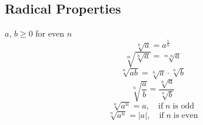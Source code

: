 \documentclass[12pt, a5paper]{article}
\begin{document}
\subsection*{Radical Properties}
\noindent $a$, $b \ge 0$ for even $n$
$$\sqrt[n]{a} = a^{\frac1{n}}$$
$$\sqrt[m]{\sqrt[n]{a}} = \sqrt[m \cdot n]{a}$$
$$\sqrt[n]{ab} = \sqrt[n]{a} \cdot \sqrt[n]{b}$$
$$\sqrt[n]{\dfrac{a}{b}} = \dfrac{\sqrt[n]{a}}{\sqrt[n]{b}}$$
$$\sqrt[n]{a^n} = a,\quad \text{if}\; n\; \text{is odd}$$
$$\sqrt[n]{a^n} = \vert a \vert,\quad \text{if}\; n\; \text{is even}$$
\end{document}
